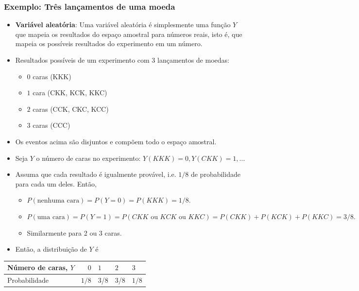 \documentclass[]{article}
\providecommand{\tightlist}{%
  \setlength{\itemsep}{0pt}\setlength{\parskip}{0pt}}
\begin{document}
\subsubsection{Exemplo: Três lançamentos de uma
moeda}\label{exemplo-tres-lancamentos-de-uma-moeda}

\begin{itemize}
\tightlist
\item
  \textbf{Variável aleatória}: Uma variável aleatória é simplesmente uma
  função \(Y\) que mapeia os resultados do espaço amostral para números
  reais, isto é, que mapeia os possíveis resultados do experimento em um
  número.
\item
  Resultados possíveis de um experimento com 3 lançamentos de moedas:

  \begin{itemize}
  \tightlist
  \item
    \(0\) caras (KKK)
  \item
    \(1\) cara (CKK, KCK, KKC)
  \item
    \(2\) caras (CCK, CKC, KCC)
  \item
    \(3\) caras (CCC)
  \end{itemize}
\item
  Os eventos acima são disjuntos e compõem todo o espaço amostral.
\item
  Seja \(Y\) o número de caras no experimento:
  \(Y(KKK) = 0, Y(CKK) = 1, \ldots\)
\item
  Assuma que cada resultado é igualmente provável, i.e. \(1/8\) de
  probabilidade para cada um deles. Então,

  \begin{itemize}
  \tightlist
  \item
    \(P(\text{nenhuma cara}) = P(Y = 0) = P(KKK) = 1/8.\)
  \item
    \(P(\text{uma cara}) = P(Y = 1) = P(CKK \text{ ou } KCK \text{ ou } KKC) = P(CKK) + P(KCK) + P(KKC) = 3/8.\)
  \item
    Similarmente para 2 ou 3 caras.
  \end{itemize}
\item
  Então, a distribuição de \(Y\) é
\end{itemize}

\begin{longtable}[]{@{}lrlll@{}}
\toprule
Número de caras, \(Y\) & \(0\) & \(1\) & \(2\) & \(3\)\tabularnewline
\midrule
\endhead
Probabilidade & \(1/8\) & 3/8 & 3/8 & \(1/8\)\tabularnewline
\bottomrule
\end{longtable}
\end{document}
